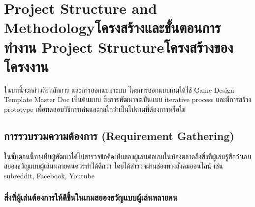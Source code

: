 \chapter{\ifproject%
\ifenglish Project Structure and Methodology\else โครงสร้างและขั้นตอนการทำงาน\fi
\else%
\ifenglish Project Structure\else โครงสร้างของโครงงาน\fi
\fi
}

ในบทนี้จะกล่าวถึงหลักการ และการออกแบบระบบ โดยการออกแบบเกมได้ใช้ Game Design Template Master Doc \cite{GDD1, GDD2} เป็นต้นแบบ ซึ่งการพัฒนาจะเป็นแบบ iterative process และมีการสร้าง prototype เพื่อทดสอบวิธีการเล่นและกลไกว่าเป็นไปตามที่ต้องการหรือไม่

\makeatletter


\makeatother

\section{การรวบรวมความต้องการ (Requirement Gathering)}

ในขั้นตอนนี้ทางทีมผู้พัฒนาได้ไปสำรวจข้อคิดเห็นของผู้เล่นต่อเกมในท้องตลาดถึงสิ่งที่ผู้เล่นรู้สึกว่าเกมสยองขวัญแบบผู้เล่นหลายคนควรทำใด้ดีกว่า โดยได้สำรวจผ่านช่องทางสังคมออนไลน์ เช่น subreddit, Facebook, Youtube

\subsection{สิ่งที่ผู้เล่นต้องการให้ดีขึ้นในเกมสยองขวัญแบบผู้เล่นหลายคน}

